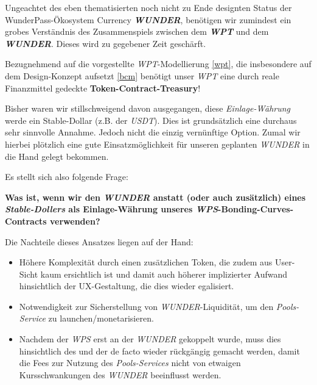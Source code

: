\vspace{0.3cm}

Ungeachtet des eben thematisierten noch nicht zu Ende designten Status der Wunder\-Pass-Ökosystem Currency \textbf{\textit{WUNDER}}, benötigen wir zumindest ein grobes Verständnis des Zusammenspiels zwischen dem \textbf{\textit{WPT}} und dem \textbf{\textit{WUNDER}}. Dieses wird zu gegebener Zeit geschärft.

\vspace{0.3cm}

\begin{Konzept}
\vspace{0.2cm}

Bezugnehmend auf die vorgestellte \textit{WPT}-Modellierung \ref{wpt}, die insbesondere auf dem Design-Konzept aufsetzt \ref{bcm} benötigt unser \textit{WPT} eine durch reale Finanzmittel gedeck\-te \textbf{Token-Contract-Treasury}!

\vspace{0.2cm}

Bisher waren wir stillschweigend davon ausgegangen, diese \textit{Einlage-Währung} werde ein Stable-Dollar (z.B. der \textit{USDT}). Dies ist grundsätzlich eine durchaus sehr sinn\-volle Annahme. Jedoch nicht die einzig vernünftige Option. Zumal wir hierbei plötzlich eine gute Einsatzmöglichkeit für unseren geplanten \textit{WUNDER} in die Hand gelegt bekommen.

\vspace{0.2cm}

Es stellt sich also folgende Frage:

\noindent\hrulefill

\textbf{Was ist, wenn wir den \textit{WUNDER} anstatt (oder auch zusätzlich) eines \textit{Stable-Dollers} als Einlage-Währung unseres \textit{WPS}-Bonding-Curves-Con\-tracts verwenden?}

\noindent\hrulefill

\vspace{0.2cm}

Die Nachteile dieses Ansatzes liegen auf der Hand:

\begin{itemize}
	\item Höhere Komplexität durch einen zusätzlichen Token, die zudem aus User-Sicht kaum ersichtlich ist und damit auch höherer implizierter Aufwand hinsichtlich der UX-Gestaltung, die dies wieder egalisiert. 
	\item Notwendigkeit zur Sicherstellung von \textit{WUNDER}-Liquidität, um den \textit{Pools-Service} zu launchen/monetarisieren.
	\item Nachdem der \textit{WPS} erst an der \textit{WUNDER} gekoppelt wurde, muss dies hinsichtlich des  und der  de facto wieder rückgängig gemacht werden, damit die Fees zur Nutzung des \textit{Pools-Services} nicht von etwaigen Kursschwankungen des \textit{WUNDER} beeinflusst werden.
	

\end{itemize}
\end{Konzept}
